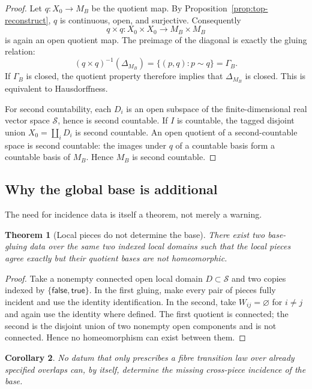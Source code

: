 \documentclass[11pt,a4paper]{article}
\newtheorem{theorem}{Theorem}[section]
\newtheorem{corollary}[theorem]{Corollary}
\theoremstyle{definition}
\theoremstyle{remark}
\newcommand{\Smodel}{\mathcal{S}}
\begin{document}
\begin{proof}
Let \(q:X_0\to M_B\) be the quotient map.  By
Proposition~\ref{prop:top-reconstruct}, \(q\) is continuous, open, and surjective.
Consequently
\[
   q\times q:X_0\times X_0\longrightarrow M_B\times M_B
\]
is again an open quotient map.  The preimage of the diagonal is exactly the
gluing relation:
\[
   (q\times q)^{-1}(\Delta_{M_B})
   =\{(p,q):p\sim q\}
   =\Gamma_B.
\]
If \(\Gamma_B\) is closed, the quotient property therefore implies that
\(\Delta_{M_B}\) is closed.  This is equivalent to Hausdorffness.

For second countability, each \(D_i\) is an open subspace of the
finite-dimensional real vector space \(\Smodel\), hence is second
countable.  If \(I\) is countable, the tagged disjoint union
\(X_0=\coprod_i D_i\) is second countable.  An open quotient of a
second-countable space is second countable: the images under \(q\) of a
countable basis form a countable basis of \(M_B\).  Hence \(M_B\) is second
countable.
\end{proof}

\subsection{Why the global base is additional}

The need for incidence data is itself a theorem, not merely a warning.

\begin{theorem}[Local pieces do not determine the base]
\label{thm:base-nonderivability}
There exist two base-gluing data over the same two indexed local domains
such that the local pieces agree exactly but their quotient bases are not
homeomorphic.
\end{theorem}

\begin{proof}
Take a nonempty connected open local domain \(D\subset\Smodel\) and two
copies indexed by \(\{\mathsf{false},\mathsf{true}\}\).  In the first
gluing, make every pair of pieces fully incident and use the identity
identification.  In the second, take \(W_{ij}=\varnothing\) for \(i\neq j\)
and again use the identity where defined.  The first quotient is connected;
the second is the disjoint union of two nonempty open components and is not
connected.  Hence no homeomorphism can exist between them.
\end{proof}

\begin{corollary}
\label{cor:fibre-not-base}
No datum that only prescribes a fibre transition law over already specified
overlaps can, by itself, determine the missing cross-piece incidence of the
base.
\end{corollary}
\end{document}
